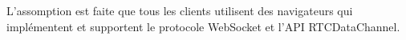 %
%
%
%
%



L'assomption est faite que tous les clients utilisent des navigateurs qui 
implémentent et supportent le protocole WebSocket et l'\gls{API} 
RTCDataChannel. 

